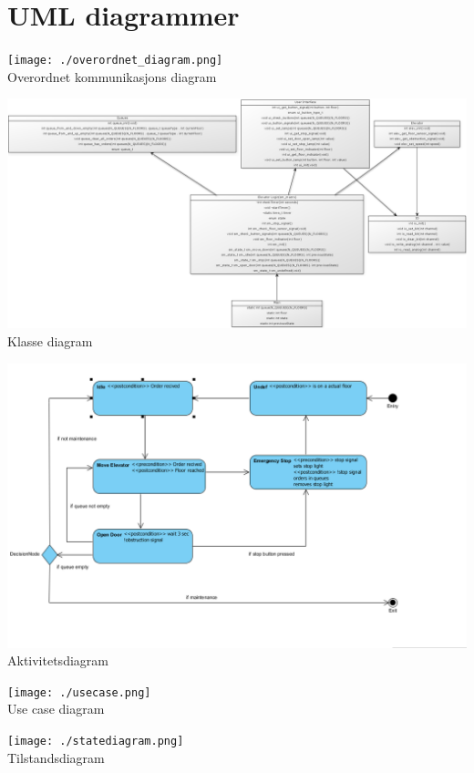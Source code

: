 \documentclass[language=norsk]{ezreport}
\begin{document}
\section*{UML diagrammer}
\begin{center}
\texttt{[image: ./overordnet\_diagram.png]}
\\Overordnet kommunikasjons diagram
\end{center}

\begin{center}
\includegraphics[scale=0.30]{./class_diagram.png}
\\Klasse diagram
\end{center}

\begin{center}
\includegraphics[scale=0.71 angel=90]{./activity_diagram.png}
\\Aktivitetsdiagram
\end{center}

\begin{center}
\texttt{[image: ./usecase.png]}
\\Use case diagram
\end{center}

\begin{center}
\texttt{[image: ./statediagram.png]}
\\Tilstandsdiagram
\end{center}
\end{document}
